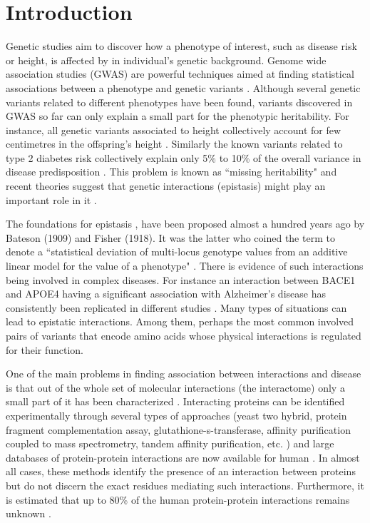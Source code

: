 \section{Introduction}

Genetic studies aim to discover how a phenotype of interest, such as disease risk or height, is affected by in individual's genetic background. Genome wide association studies (GWAS) are powerful techniques aimed at finding statistical associations between a phenotype and genetic variants \cite{clarke2011basic}. Although several genetic variants related to different phenotypes have been found, variants discovered in GWAS so far can only explain a small part for the phenotypic heritability. For instance, all genetic variants associated to height collectively account for few centimetres in the offspring's height \cite{wood2014defining}. Similarly the known variants related to type 2 diabetes risk collectively explain only 5\% to 10\% of the overall variance in disease predisposition \cite{morris2012large, consortium2014genome}. This problem is known as ``missing heritability" \cite{manolio2009finding} and recent theories suggest that genetic interactions (epistasis) might play an important role in it \cite{zuk2012mystery, zuk2014searching}.

The foundations for epistasis \cite{gao2010classification}, have been proposed almost a hundred years ago by Bateson (1909) and Fisher (1918). It was the latter who coined the term to denote a ``statistical deviation of multi-locus genotype values from an additive linear model for the value of a phenotype" \cite{gao2010classification}. There is evidence of such interactions being involved in complex diseases. For instance an interaction between BACE1 and APOE4 having a significant association with Alzheimer's disease has consistently been replicated in different studies \cite{combarros2009epistasis}. Many types of situations can lead to epistatic interactions. Among them, perhaps the most common involved pairs of variants that encode amino acids whose physical interactions is regulated for their function.

One of the main problems in finding association between interactions and disease is that out of the whole set of molecular interactions (the interactome) only a small part of it has been characterized \cite{venkatesan2009empirical}. Interacting proteins can be identified experimentally through several types of approaches (yeast two hybrid, protein fragment complementation assay, glutathione-s-transferase, affinity purification coupled to mass spectrometry, tandem affinity purification, etc. \cite{shoemaker2007deciphering}) and large databases of protein-protein interactions are now available for human \cite{stark2006biogrid, shoemaker2007deciphering}. In almost all cases, these methods identify the presence of an interaction between proteins but do not discern the exact residues mediating such interactions. Furthermore, it is estimated that up to 80\% of the human protein-protein interactions remains unknown \cite{venkatesan2009empirical}.

